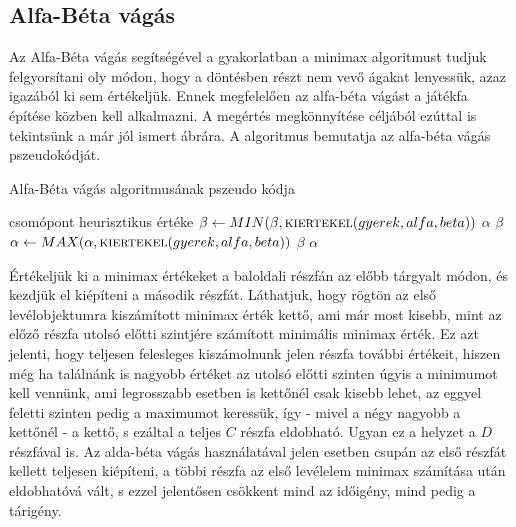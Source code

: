 \subsection{Alfa-Béta vágás}
Az Alfa-Béta vágás segítségével a gyakorlatban a minimax algoritmust tudjuk felgyorsítani oly módon, hogy a döntésben részt nem vevő ágakat lenyessük, azaz igazából ki sem értékeljük. Ennek megfelelően az alfa-béta vágást a játékfa építése közben kell alkalmazni. A megértés megkönnyítése céljából ezúttal is tekintsünk a már jól ismert  ábrára. A  algoritmus bemutatja az alfa-béta vágás pszeudokódját.\ujsor

\begin{algorithm}
	\caption{Alfa-Béta vágás algoritmusának pszeudo kódja}
	\label{alg:alfabeta}
	\begin{algorithmic}[1]
		\State \Return csomópont heurisztikus értéke
		\EndIf
		\State $\beta \gets MIN(\beta, \Call{kiertekel}{gyerek, alfa, beta})$
		\If {$\beta <= \alpha$}
		\State \Return $\alpha$
		\EndIf
		\EndFor
		\State \Return $\beta$
		\EndIf		
		\State $\alpha \gets MAX(\alpha, \Call{kiertekel}{gyerek, alfa, beta})$
		\If {$\beta <= \alpha$}
		\State \Return $\beta$
		\EndIf
		\EndFor
		\State \Return $\alpha$
		\EndIf	
		\EndFunction
	\end{algorithmic}
\end{algorithm}


Értékeljük ki a minimax értékeket a baloldali részfán az előbb tárgyalt módon, és kezdjük el kiépíteni a második részfát. Láthatjuk, hogy rögtön az első levélobjektumra kiszámított minimax érték kettő, ami már most kisebb, mint az előző részfa utolsó előtti szintjére számított minimális minimax érték. Ez azt jelenti, hogy teljesen felesleges kiszámolnunk jelen részfa további értékeit, hiszen még ha találnánk is nagyobb értéket az utolsó előtti szinten úgyis a minimumot kell vennünk, ami legrosszabb esetben is kettőnél csak kisebb lehet, az eggyel feletti szinten pedig a maximumot keressük, így - mivel a négy nagyobb a kettőnél - a kettő, s ezáltal a teljes $C$ részfa eldobható. Ugyan ez a helyzet a $D$ részfával is. Az alda-béta vágás használatával jelen esetben csupán az első részfát kellett teljesen kiépíteni, a többi részfa az első levélelem minimax számítása után eldobhatóvá vált, s ezzel jelentősen csökkent mind az időigény, mind pedig a tárigény.\ujsor

